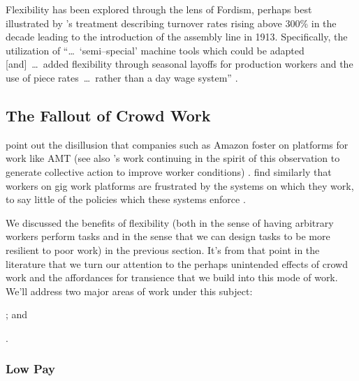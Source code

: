 \documentclass{sigchi}
\newcommand{\msb}[1]{{\color{PineGreen}[MSB: #1]}}
\begin{document}
Flexibility has been explored through the lens of Fordism, perhaps best illustrated by
\citeauthor{tolliday1986between}'s treatment describing
turnover rates rising above 300\% in the decade leading to the introduction of the assembly line in 1913.
Specifically, the utilization of ``\dots~`semi--special' machine tools which could be adapted
[and]~\dots~added flexibility through seasonal layoffs for production workers and the use of
piece rates~\dots~rather than a day wage system''
\cite{tolliday1986between}.







\subsection{The Fallout of Crowd Work}\label{sec:Fallout}
\citeauthor{turkopticon} point out the disillusion that companies such as Amazon foster on platforms for work like AMT
(see also \citeauthor{dynamo}'s work
continuing in the spirit of this observation to generate collective action to improve worker conditions)
\cite{turkopticon,dynamo}.
\citeauthor{uberAlgorithm}
find similarly that workers on gig work platforms are frustrated by the systems on which they work,
to say little of the policies which these systems enforce
\cite{uberAlgorithm}.

We discussed the benefits of flexibility
(both in the sense of having arbitrary workers perform tasks and
in the sense that we can design tasks to be more resilient to poor work)
in the previous section.
It's from that point in the literature that we turn our attention to
the perhaps unintended effects of crowd work
and the affordances for transience that we build into this mode of work.
We'll address two major areas of work under this subject:
\begin{inlinelist}
\item {}; and
\item {}.
\end{inlinelist}

\subsubsection{Low Pay}\label{sec:lowPay}
\end{document}
